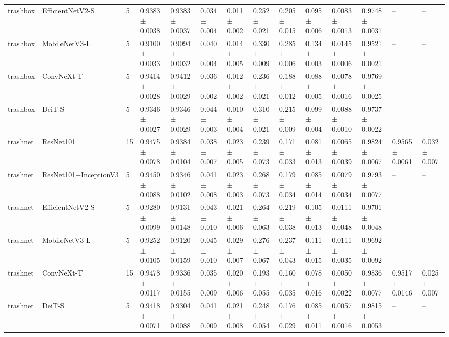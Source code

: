 \begin{table}[ht]
\begin{tabular}{llllllllllllll}
trashbox & EfficientNetV2-S & 5 & 0.9383 $\pm$ 0.0038 & 0.9383 $\pm$ 0.0037 & 0.034 $\pm$ 0.004 & 0.011 $\pm$ 0.002 & 0.252 $\pm$ 0.021 & 0.205 $\pm$ 0.015 & 0.095 $\pm$ 0.006 & 0.0083 $\pm$ 0.0013 & 0.9748 $\pm$ 0.0031 & – & – \\
trashbox & MobileNetV3-L & 5 & 0.9100 $\pm$ 0.0033 & 0.9094 $\pm$ 0.0032 & 0.040 $\pm$ 0.004 & 0.014 $\pm$ 0.005 & 0.330 $\pm$ 0.009 & 0.285 $\pm$ 0.006 & 0.134 $\pm$ 0.003 & 0.0145 $\pm$ 0.0006 & 0.9521 $\pm$ 0.0021 & – & – \\
trashbox & ConvNeXt-T & 5 & 0.9414 $\pm$ 0.0028 & 0.9412 $\pm$ 0.0029 & 0.036 $\pm$ 0.002 & 0.012 $\pm$ 0.002 & 0.236 $\pm$ 0.021 & 0.188 $\pm$ 0.012 & 0.088 $\pm$ 0.005 & 0.0078 $\pm$ 0.0016 & 0.9769 $\pm$ 0.0025 & – & – \\
trashbox & DeiT-S & 5 & 0.9346 $\pm$ 0.0027 & 0.9346 $\pm$ 0.0029 & 0.044 $\pm$ 0.003 & 0.010 $\pm$ 0.004 & 0.310 $\pm$ 0.021 & 0.215 $\pm$ 0.009 & 0.099 $\pm$ 0.004 & 0.0088 $\pm$ 0.0010 & 0.9737 $\pm$ 0.0022 & – & – \\
trashnet & ResNet101 & 15 & 0.9475 $\pm$ 0.0078 & 0.9384 $\pm$ 0.0104 & 0.038 $\pm$ 0.007 & 0.023 $\pm$ 0.005 & 0.239 $\pm$ 0.073 & 0.171 $\pm$ 0.033 & 0.081 $\pm$ 0.013 & 0.0065 $\pm$ 0.0039 & 0.9824 $\pm$ 0.0067 & 0.9565 $\pm$ 0.0061 & 0.032 $\pm$ 0.007 \\
trashnet & ResNet101+InceptionV3 & 5 & 0.9450 $\pm$ 0.0088 & 0.9346 $\pm$ 0.0102 & 0.041 $\pm$ 0.008 & 0.023 $\pm$ 0.003 & 0.268 $\pm$ 0.073 & 0.179 $\pm$ 0.034 & 0.085 $\pm$ 0.014 & 0.0079 $\pm$ 0.0034 & 0.9793 $\pm$ 0.0077 & – & – \\
trashnet & EfficientNetV2-S & 5 & 0.9280 $\pm$ 0.0099 & 0.9131 $\pm$ 0.0148 & 0.043 $\pm$ 0.010 & 0.021 $\pm$ 0.006 & 0.264 $\pm$ 0.063 & 0.219 $\pm$ 0.038 & 0.105 $\pm$ 0.013 & 0.0111 $\pm$ 0.0048 & 0.9701 $\pm$ 0.0048 & – & – \\
trashnet & MobileNetV3-L & 5 & 0.9252 $\pm$ 0.0105 & 0.9120 $\pm$ 0.0159 & 0.045 $\pm$ 0.010 & 0.029 $\pm$ 0.007 & 0.276 $\pm$ 0.067 & 0.237 $\pm$ 0.043 & 0.111 $\pm$ 0.015 & 0.0111 $\pm$ 0.0035 & 0.9692 $\pm$ 0.0092 & – & – \\
trashnet & ConvNeXt-T & 15 & 0.9478 $\pm$ 0.0117 & 0.9336 $\pm$ 0.0155 & 0.035 $\pm$ 0.009 & 0.020 $\pm$ 0.006 & 0.193 $\pm$ 0.055 & 0.160 $\pm$ 0.035 & 0.078 $\pm$ 0.016 & 0.0050 $\pm$ 0.0022 & 0.9836 $\pm$ 0.0077 & 0.9517 $\pm$ 0.0146 & 0.025 $\pm$ 0.007 \\
trashnet & DeiT-S & 5 & 0.9418 $\pm$ 0.0071 & 0.9304 $\pm$ 0.0088 & 0.041 $\pm$ 0.009 & 0.021 $\pm$ 0.008 & 0.248 $\pm$ 0.054 & 0.176 $\pm$ 0.029 & 0.085 $\pm$ 0.011 & 0.0057 $\pm$ 0.0016 & 0.9815 $\pm$ 0.0053 & – & – \\
\hline
\end{tabular}
\end{table}